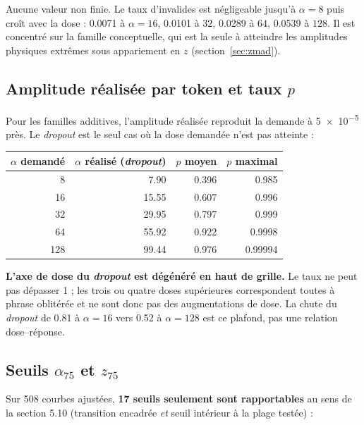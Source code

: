 \documentclass[11pt,a4paper]{article}
\begin{document}
\noindent
Aucune valeur non finie. Le taux d'invalides est négligeable jusqu'à $\alpha = 8$ puis
croît avec la dose : \num{0.0071} à $\alpha=16$, \num{0.0101} à $32$, \num{0.0289} à
$64$, \num{0.0539} à $128$. Il est concentré sur la famille conceptuelle, qui est la
seule à atteindre les amplitudes physiques extrêmes sous appariement en $z$
(section~\ref{sec:zmad}).

\subsection{Amplitude réalisée par token et taux \texorpdfstring{$p$}{p}}

Pour les familles additives, l'amplitude réalisée reproduit la demande à \num{5e-5} près.
Le \emph{dropout} est le seul cas où la dose demandée n'est pas atteinte :

\begin{center}
\begin{tabular}{rrrr}
\toprule
$\alpha$ demandé & $\alpha$ réalisé (\emph{dropout}) & $p$ moyen & $p$ maximal \\
\midrule
8   & \num{7.90}  & \num{0.396} & \num{0.985} \\
16  & \num{15.55} & \num{0.607} & \num{0.996} \\
32  & \num{29.95} & \num{0.797} & \num{0.999} \\
64  & \num{55.92} & \num{0.922} & \num{0.9998} \\
128 & \num{99.44} & \num{0.976} & \num{0.99994} \\
\bottomrule
\end{tabular}
\end{center}

\noindent
\textbf{L'axe de dose du \emph{dropout} est dégénéré en haut de grille.} Le taux ne peut
pas dépasser 1 ; les trois ou quatre doses supérieures correspondent toutes à
\og phrase oblitérée \fg{} et ne sont donc pas des augmentations de dose. La chute du
\emph{dropout} de \num{0.81} à $\alpha=16$ vers \num{0.52} à $\alpha=128$ est ce plafond,
pas une relation dose--réponse.

\subsection{Seuils \texorpdfstring{$\alpha_{75}$}{alpha75} et \texorpdfstring{$z_{75}$}{z75}}

Sur \num{508} courbes ajustées, \textbf{17 seuils seulement sont rapportables} au sens de
la section 5.10 (transition encadrée \emph{et} seuil intérieur à la plage testée) :
\end{document}
